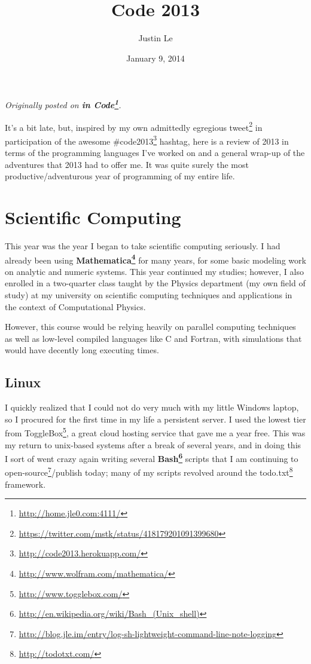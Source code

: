 \documentclass[]{article}
\title{Code 2013}
\author{Justin Le}
\date{January 9, 2014}
\renewcommand{\href}[2]{#2\footnote{\url{#1}}}
\begin{document}
\maketitle

\emph{Originally posted on \textbf{\href{http://home.jle0.com:4111/}{in
Code}}.}

It's a bit late, but, inspired by my own admittedly egregious
\href{https://twitter.com/mstk/status/418179201091399680}{tweet} in
participation of the awesome
\href{http://code2013.herokuapp.com/}{\#code2013} hashtag, here is a
review of 2013 in terms of the programming languages I've worked on and
a general wrap-up of the adventures that 2013 had to offer me. It was
quite surely the most productive/adventurous year of programming of my
entire life.

\section{Scientific Computing}\label{scientific-computing}

This year was the year I began to take scientific computing seriously. I
had already been using
\textbf{\href{http://www.wolfram.com/mathematica/}{Mathematica}} for
many years, for some basic modeling work on analytic and numeric
systems. This year continued my studies; however, I also enrolled in a
two-quarter class taught by the Physics department (my own field of
study) at my university on scientific computing techniques and
applications in the context of Computational Physics.

However, this course would be relying heavily on parallel computing
techniques as well as low-level compiled languages like C and Fortran,
with simulations that would have decently long executing times.

\subsection{Linux}\label{linux}

I quickly realized that I could not do very much with my little Windows
laptop, so I procured for the first time in my life a persistent server.
I used the lowest tier from \href{http://www.togglebox.com/}{ToggleBox},
a great cloud hosting service that gave me a year free. This was my
return to unix-based systems after a break of several years, and in
doing this I sort of went crazy again writing several
\textbf{\href{http://en.wikipedia.org/wiki/Bash_(Unix_shell)}{Bash}}
scripts that I am continuing to
\href{http://blog.jle.im/entry/log-sh-lightweight-command-line-note-logging}{open-source}/publish
today; many of my scripts revolved around the
\href{http://todotxt.com/}{todo.txt} framework.
\end{document}
